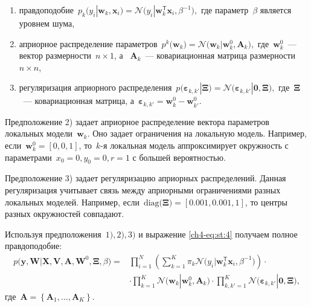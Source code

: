 \documentclass{dissert}
\begin{document}
\begin{enumerate}[1)]
	\item правдоподобие~$p_{k}\bigr(y_{i}|\mathbf{w}_{k}, \mathbf{x}_{i}\bigr) = \mathcal{N}\bigr(y_{i}|\mathbf{w}_{k}^{\mathsf{T}}\mathbf{x}_{i}, \beta^{-1}\bigr),$ где параметр~$\beta$ является уровнем шума,
	\item априорное распределение параметров~$p^{k}\bigr(\mathbf{w}_{k}\bigr) = \mathcal{N}\bigr(\mathbf{w}_{k}|\mathbf{w}^{0}_{k}, \mathbf{A}_{k}\bigr),$ где~$\mathbf{w}^{0}_{k}$~--- вектор размерности~$n\times1$, а ~$\mathbf{A}_{k}$~--- ковариационная матрица размерности~$n\times n$,
	\item регуляризация априорного распределения~$p\bigr(\bm{\varepsilon}_{k,k'}|\bm{\Xi}\bigr) = \mathcal{N}\bigr(\bm{\varepsilon}_{k,k'}|\mathbf{0},  \bm{\Xi}\bigr),$ где~$\bm{\Xi}$~--- ковариационная матрица, а~$\bm{\varepsilon}_{k,k'} = \mathbf{w}_{k}^{0}-\mathbf{w}_{k'}^{0}.$
\end{enumerate}
Предположение 2) задает априорное распределение вектора параметров локальных модели~$\textbf{w}_k$. Оно задает ограничения на локальную модель. Например, если~$\textbf{w}_k^{0} = [0,0,1]$, то~$k$-я локальная модель аппроксимирует окружность с параметрами~$x_0=0, y_0=0, r=1$ с большей вероятностью.

Предположение 3) задает регуляризацию априорных распределений. Данная регуляризация учитывает связь между априорными ограничениями разных локальных моделей. Например, если~$\text{diag}\bigr(\bm{\Xi}\bigr)=[0.001, 0.001, 1]$, то  центры разных окружностей совпадают.

Используя предположения~$1), 2), 3)$ и выражение \eqref{ch4-eq:st:4} получаем полное правдоподобие:
\[
\label{ch4-eq:em:1}
\begin{aligned}
p\bigr(\mathbf{y}, \mathbf{W}|\mathbf{X}, \mathbf{V}, \textbf{A}, \textbf{W}^{0}, \bm{\Xi}, \beta\bigr) = &\prod_{i=1}^{N}\left(\sum_{k=1}^{K}\pi_{k}\mathcal{N}\bigr(y_{i}|\mathbf{w}_{k}^{\mathsf{T}}\mathbf{x}_{i}, \beta^{-1}\bigr)\right)\cdot\\
&\cdot\prod_{k=1}^{K}\mathcal{N}\bigr(\mathbf{w}_{k}|\mathbf{w}^{0}_{k}, \mathbf{A}_{k}\bigr)\cdot\prod_{k,k'=1}^{K}\mathcal{N}\bigr(\bm{\varepsilon}_{k,k'}|\mathbf{0},  \bm{\Xi}\bigr),
\end{aligned}
\]
где~$\mathbf{A} = \left\{\mathbf{A}_1, \ldots, \mathbf{A}_K\right\}.$
 
\end{document}
